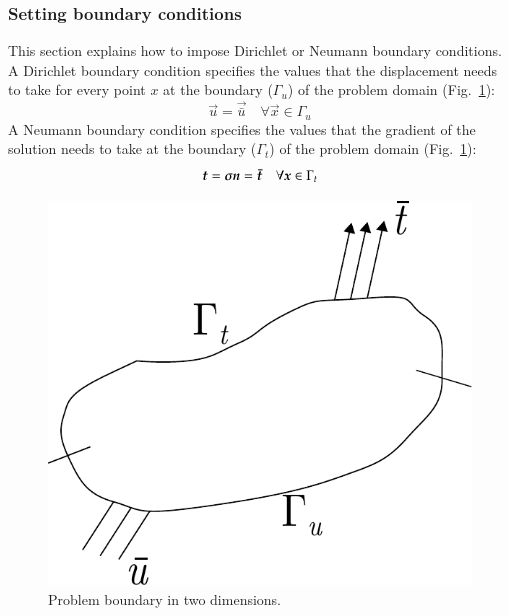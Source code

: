 \subsubsection{Setting boundary conditions\label{sect:smm:boundary}}
This section explains how to impose Dirichlet or Neumann boundary conditions. A
Dirichlet boundary condition specifies the values that the displacement needs to
take for every point $x$ at the boundary ($\Gamma_u$) of the problem domain
(Fig.~\ref{fig:smm:boundaries}):
\begin{equation}
  \vec{u} = \vec{\bar u} \quad \forall \vec{x}\in \Gamma_{u}
\end{equation}
A  Neumann boundary  condition specifies  the values  that the  gradient  of the
solution  needs to  take  at the  boundary  ($\Gamma_t$) of  the problem  domain
(Fig.~\ref{fig:smm:boundaries}):
\begin{equation}
  \boldsymbol{t} = \boldsymbol{\sigma} \boldsymbol{n} = \boldsymbol{\bar t} \quad \forall \boldsymbol{x}\in \Gamma_{t}
\end{equation}
\begin{figure}[!htb]
  \centering
  \includegraphics[scale=0.6]{figures/boundary}
  \caption{Problem boundary in two dimensions.\label{fig:smm:boundaries}}
\end{figure}

